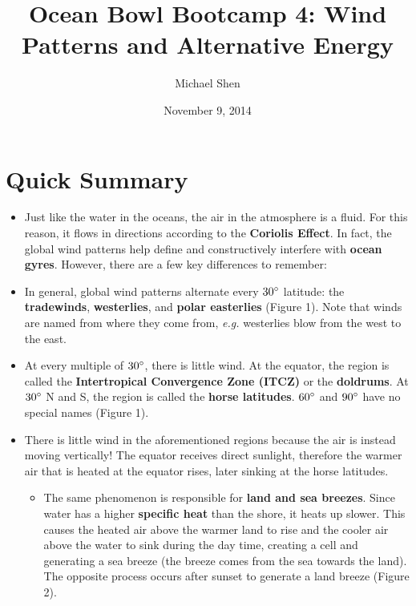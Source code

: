\documentclass{article}
\begin{document}
\title{Ocean Bowl Bootcamp 4: Wind Patterns and Alternative Energy}
\author{Michael Shen}
\date{November 9, 2014}
\maketitle

\section{Quick Summary}

\begin{itemize}
	\item Just like the water in the oceans, the air in the atmosphere is a fluid. For this reason, it flows in directions according to the \textbf{Coriolis Effect}. In fact, the global wind patterns help define and constructively interfere with \textbf{ocean gyres}. However, there are a few key differences to remember:
	
	\item In general, global wind patterns alternate every $30\degree$ latitude: the \textbf{tradewinds}, \textbf{westerlies}, and \textbf{polar easterlies} (Figure 1). Note that winds are named from where they come from, \textit{e.g.} westerlies blow from the west to the east.
	
	\item At every multiple of $30\degree$, there is little wind. At the equator, the region is called the \textbf{Intertropical Convergence Zone (ITCZ)} or the \textbf{doldrums}. At $30\degree$ N and S, the region is called the \textbf{horse latitudes}. $60\degree$ and $90\degree$ have no special names (Figure 1).
	
	\item There is little wind in the aforementioned regions because the air is instead moving vertically! The equator receives direct sunlight, therefore the warmer air that is heated at the equator rises, later sinking at the horse latitudes.
	\begin{itemize}
		\item The same phenomenon is responsible for \textbf{land and sea breezes}. Since water has a higher \textbf{specific heat} than the shore, it heats up slower. This causes the heated air above the warmer land to rise and the cooler air above the water to sink during the day time, creating a cell and generating a sea breeze (the breeze comes from the sea towards the land). The opposite process occurs after sunset to generate a land breeze (Figure 2).
	\end{itemize}
	

\end{itemize}
\end{document}
